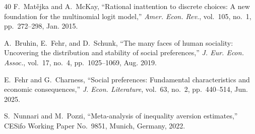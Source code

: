 \documentclass[journal]{IEEEtran}
\begin{document}
\begin{thebibliography}{40}
F.~Mat\v{e}jka and A.~McKay, ``Rational inattention to discrete choices: A new foundation for the multinomial logit model,''
\emph{Amer. Econ. Rev.}, vol.~105, no.~1, pp.~272--298, Jan. 2015.

A.~Bruhin, E.~Fehr, and D.~Schunk, ``The many faces of human sociality: Uncovering the distribution and stability of social preferences,''
\emph{J. Eur. Econ. Assoc.}, vol.~17, no.~4, pp.~1025--1069, Aug. 2019.

E.~Fehr and G.~Charness, ``Social preferences: Fundamental characteristics and economic consequences,''
\emph{J. Econ. Literature}, vol.~63, no.~2, pp.~440--514, Jun. 2025.

S.~Nunnari and M.~Pozzi, ``Meta-analysis of inequality aversion estimates,''
CESifo Working Paper No.~9851, Munich, Germany, 2022.

\end{thebibliography}

\balance
\end{document}
